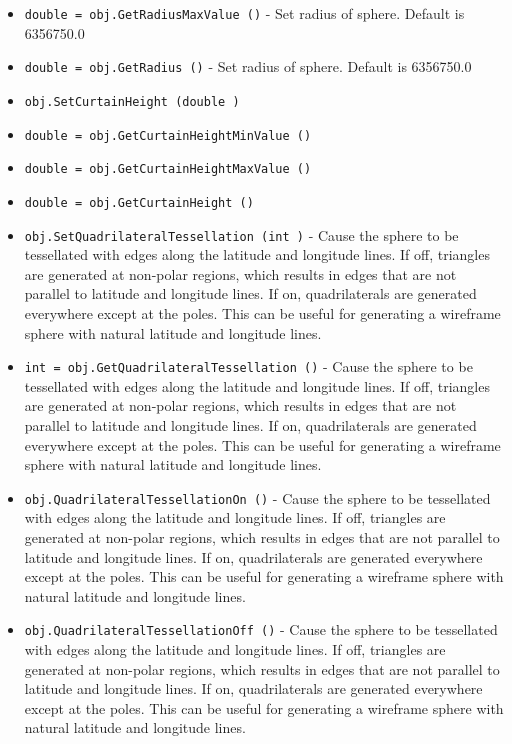 \begin{itemize}
\item  \verb|double = obj.GetRadiusMaxValue ()| -  Set radius of sphere. Default is 6356750.0

\item  \verb|double = obj.GetRadius ()| -  Set radius of sphere. Default is 6356750.0

\item  \verb|obj.SetCurtainHeight (double )|

\item  \verb|double = obj.GetCurtainHeightMinValue ()|

\item  \verb|double = obj.GetCurtainHeightMaxValue ()|

\item  \verb|double = obj.GetCurtainHeight ()|

\item  \verb|obj.SetQuadrilateralTessellation (int )| -  Cause the sphere to be tessellated with edges along the latitude
 and longitude lines. If off, triangles are generated at non-polar
 regions, which results in edges that are not parallel to latitude and
 longitude lines. If on, quadrilaterals are generated everywhere
 except at the poles. This can be useful for generating a wireframe
 sphere with natural latitude and longitude lines.

\item  \verb|int = obj.GetQuadrilateralTessellation ()| -  Cause the sphere to be tessellated with edges along the latitude
 and longitude lines. If off, triangles are generated at non-polar
 regions, which results in edges that are not parallel to latitude and
 longitude lines. If on, quadrilaterals are generated everywhere
 except at the poles. This can be useful for generating a wireframe
 sphere with natural latitude and longitude lines.

\item  \verb|obj.QuadrilateralTessellationOn ()| -  Cause the sphere to be tessellated with edges along the latitude
 and longitude lines. If off, triangles are generated at non-polar
 regions, which results in edges that are not parallel to latitude and
 longitude lines. If on, quadrilaterals are generated everywhere
 except at the poles. This can be useful for generating a wireframe
 sphere with natural latitude and longitude lines.

\item  \verb|obj.QuadrilateralTessellationOff ()| -  Cause the sphere to be tessellated with edges along the latitude
 and longitude lines. If off, triangles are generated at non-polar
 regions, which results in edges that are not parallel to latitude and
 longitude lines. If on, quadrilaterals are generated everywhere
 except at the poles. This can be useful for generating a wireframe
 sphere with natural latitude and longitude lines.

\end{itemize}
